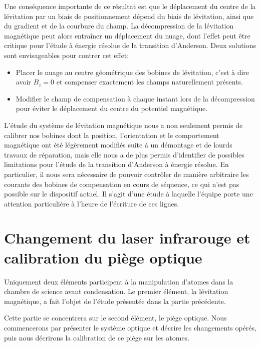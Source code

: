 Une conséquence importante de ce résultat est que le déplacement du centre de la lévitation par un biais de positionnement dépend du biais de lévitation, ainsi que du gradient et de la courbure du champ. La décompression de la lévitation magnétique peut alors entraîner un déplacement du nuage, dont l'effet peut être critique pour l'étude à énergie résolue de la transition d'Anderson. Deux solutions sont envisageables pour contrer cet effet: 
\begin{itemize}
\item[\textendash] Placer le nuage au centre géométrique des bobines de lévitation, c'est à dire avoir $B_z=0$ et compenser exactement les champs naturellement présents. 
\item[\textendash] Modifier le champ de compensation à chaque instant lors de la décompression pour éviter le déplacement du centre du potentiel magnétique.
\end{itemize}

L'étude du système de lévitation magnétique nous a non seulement permis de calibrer nos bobines dont la position, l'orientation et le comportement magnétique ont été légèrement modifiés suite à un démontage et de lourds travaux de réparation, mais elle nous a de plus permis d'identifier de possibles limitations pour l'étude de la transition d'Anderson à énergie résolue. En particulier, il nous sera nécessaire de pouvoir contrôler de manière arbitraire les courants des bobines de compensation en cours de séquence, ce qui n'est pas possible sur le dispositif actuel. Il s'agit d'une étude à laquelle l'équipe porte une attention particulière à l'heure de l'écriture de ces lignes.












\section{Changement du laser infrarouge et calibration du piège optique}
Uniquement deux éléments participent à la manipulation d'atomes dans la chambre de science avant condensation. Le premier élément, la lévitation magnétique, a fait l'objet de l'étude présentée dans la partie précédente. 

Cette partie se concentrera sur le second élément, le piège optique. Nous commencerons par présenter le système optique et décrire les changements opérés, puis nous décrirons la calibration de ce piège sur les atomes.

